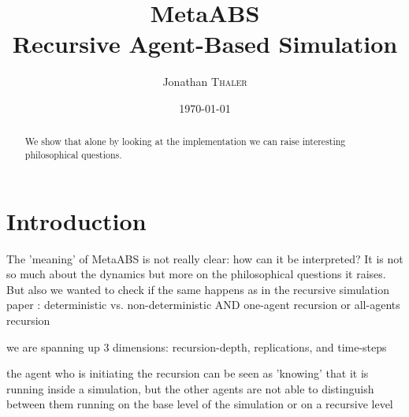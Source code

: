 \documentclass[twocolumn]{article}
\title{MetaABS \\ Recursive Agent-Based Simulation} %
\author{Jonathan \textsc{Thaler}} %
\date{\today} %
\begin{document}
\maketitle %

\begin{abstract}
We show that alone by looking at the implementation we can raise interesting philosophical questions.
\end{abstract}

\section{Introduction}
The 'meaning' of MetaABS is not really clear: how can it be interpreted?
It is not so much about the dynamics but more on the philosophical questions it raises.
But also we wanted to check if the same happens as in the recursive simulation paper \cite{gilmer_recursive_2000}: deterministic vs. non-deterministic AND one-agent recursion or all-agents recursion

we are spanning up 3 dimensions: recursion-depth, replications, and time-steps

the agent who is initiating the recursion can be seen as 'knowing' that it is running inside a simulation, but the other agents are not able to distinguish between them running on the base level of the simulation or on a recursive level



\end{document}
